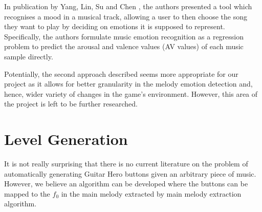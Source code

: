 In publication by Yang, Lin, Su and Chen \cite{mood}, the authors presented a tool which recognises a mood in a musical track, allowing a user to then choose the song they want to play by deciding on emotions it is supposed to represent.
Specifically, the authors formulate music emotion recognition as a regression problem to predict the arousal and valence values (AV values) of each music sample directly.

Potentially, the second approach described seems more appropriate for our project as it allows for better granularity in the melody emotion detection and, hence, wider variety of changes in the game's environment. However, this area of the project is left to be further researched.


\vspace{20pt}


\section{Level Generation}
It is not really surprising that there is no current literature on the problem of automatically generating Guitar Hero buttons given an arbitrary piece of music.
However, we believe an algorithm can be developed where the buttons can be mapped to the $f_{0}$ in the main melody extracted by main melody extraction algorithm.